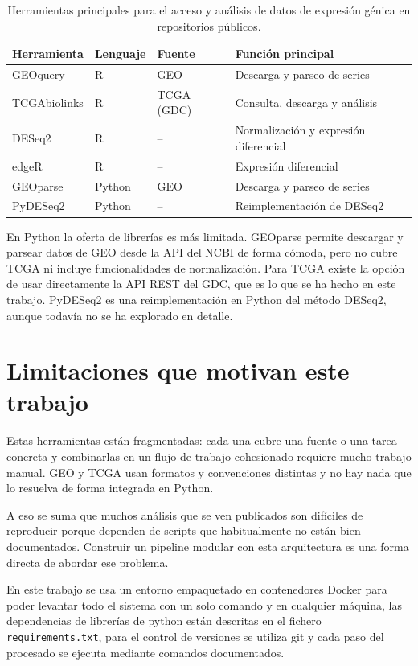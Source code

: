\documentclass[12pt, a4paper]{report}
\begin{document}
\begin{table}[htbp]
\caption{Herramientas principales para el acceso y análisis de datos de expresión génica en repositorios públicos.}
\label{tab:herramientas}
\centering
\begin{tabular}{llll}
\toprule
\textbf{Herramienta} & \textbf{Lenguaje} & \textbf{Fuente} & \textbf{Función principal} \\
\midrule
GEOquery     & R & GEO        & Descarga y parseo de series \\
TCGAbiolinks & R & TCGA (GDC) & Consulta, descarga y análisis \\
DESeq2       & R & --         & Normalización y expresión diferencial \\
edgeR        & R & --         & Expresión diferencial \\
GEOparse     & Python & GEO  & Descarga y parseo de series \\
PyDESeq2     & Python & --   & Reimplementación de DESeq2 \\
\midrule
\end{tabular}
\end{table}

En Python la oferta de librerías es más limitada. GEOparse \cite{gumienny_geoparse_nodate} permite descargar y parsear datos de GEO desde la API del NCBI de forma cómoda, pero no cubre TCGA ni incluye funcionalidades de normalización. Para TCGA existe la opción de usar directamente la API REST del GDC, que es lo que se ha hecho en este trabajo. PyDESeq2 es una reimplementación en Python del método DESeq2, aunque todavía no se ha explorado en detalle.

\section{Limitaciones que motivan este trabajo}

Estas herramientas están fragmentadas: cada una cubre una fuente o una tarea concreta y combinarlas en un flujo de trabajo cohesionado requiere mucho trabajo manual. GEO y TCGA usan formatos y convenciones distintas y no hay nada que lo resuelva de forma integrada en Python.

A eso se suma que muchos análisis que se ven publicados son difíciles de reproducir porque dependen de scripts que habitualmente no están bien documentados. Construir un pipeline modular con esta arquitectura es una forma directa de abordar ese problema.

En este trabajo se usa un entorno empaquetado en contenedores Docker para poder levantar todo el sistema con un solo comando y en cualquier máquina, las dependencias de librerías de python están descritas en el fichero \texttt{requirements.txt}, para el control de versiones se utiliza git y cada paso del procesado se ejecuta mediante comandos documentados.
\end{document}
